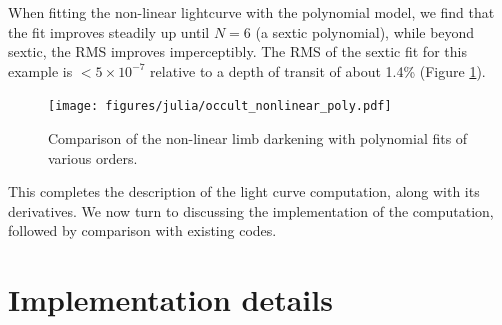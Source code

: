 \documentclass[modern,trackchanges]{aastex63}
\begin{document}
When fitting the non-linear lightcurve with the polynomial model,
we find that the fit improves steadily up until $N=6$ (a sextic
polynomial), while beyond sextic, the RMS improves imperceptibly.
The RMS of the sextic fit for this example is $<5 \times 10^{-7}$
relative to a depth of transit of about 1.4\% (Figure \ref{fig:nonlinear}).

\begin{figure}
    \begin{centering}
    \texttt{[image: figures/julia/occult\_nonlinear\_poly.pdf]}
    \caption{Comparison of the non-linear limb darkening with polynomial
    fits of various orders.
    \label{fig:nonlinear}}
    \end{centering}
\end{figure}

%
%
%
%

This completes the description of the light curve computation, along
with its derivatives.  We now turn to discussing the implementation of
the computation, followed by comparison with existing codes.

\section{Implementation details}
\label{sec:implementation}
\end{document}
